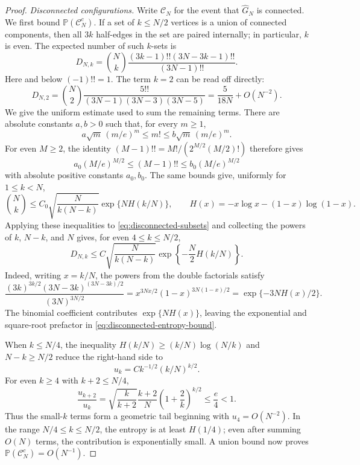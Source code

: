 \documentclass[11pt]{article}
\newcommand{\Pp}{\mathbb P}
\theoremstyle{plain}
\theoremstyle{definition}
\numberwithin{equation}{section}
\begin{document}
\begin{proof}
\noindent\emph{Disconnected configurations.}
Write $\mathcal C_N$ for the event that $\widehat G_N$ is connected.  We first
bound $\Pp(\mathcal C_N^c)$.  If a set of $k\leq N/2$ vertices is a union of
connected components, then all $3k$ half-edges in the set are paired
internally; in particular, $k$ is even.  The expected number of such
$k$-sets is
\begin{equation}\label{eq:disconnected-subsets}
  D_{N,k}=\binom Nk
  \frac{(3k-1)!!(3N-3k-1)!!}{(3N-1)!!}.
\end{equation}
Here and below $(-1)!!=1$.  The term $k=2$ can be read off directly:
\[
  D_{N,2}
  =\binom N2\frac{5!!}{(3N-1)(3N-3)(3N-5)}
  =\frac{5}{18N}+O(N^{-2}).
\]
We give the uniform estimate used to sum the remaining terms.  There are
absolute constants $a,b>0$ such that, for every $m\geq1$,
\begin{equation}\label{eq:stirling-bounds}
 a\sqrt m\,(m/e)^m\leq m!\leq b\sqrt m\,(m/e)^m.
\end{equation}
For even $M\geq2$, the identity
$(M-1)!!=M!/(2^{M/2}(M/2)!)$ therefore gives
\begin{equation}\label{eq:double-factorial-bounds}
 a_0(M/e)^{M/2}\leq (M-1)!!
 \leq b_0(M/e)^{M/2}
\end{equation}
with absolute positive constants $a_0,b_0$.  The same bounds give, uniformly
for $1\leq k<N$,
\[
 \binom Nk\leq
 C_0\sqrt{\frac{N}{k(N-k)}}\exp\{NH(k/N)\},
 \qquad
 H(x)=-x\log x-(1-x)\log(1-x).
\]
Applying these inequalities to \eqref{eq:disconnected-subsets} and collecting
the powers of $k$, $N-k$, and $N$ gives, for even $4\leq k\leq N/2$,
\begin{equation}\label{eq:disconnected-entropy-bound}
  D_{N,k}\leq
  C\sqrt{\frac{N}{k(N-k)}}
  \exp\left\{-\frac N2 H(k/N)\right\}.
\end{equation}
Indeed, writing $x=k/N$, the powers from the double factorials satisfy
\[
 \frac{(3k)^{3k/2}(3N-3k)^{(3N-3k)/2}}
      {(3N)^{3N/2}}
 =x^{3Nx/2}(1-x)^{3N(1-x)/2}
 =\exp\{-3NH(x)/2\}.
\]
The binomial coefficient contributes $\exp\{NH(x)\}$, leaving the
exponential and square-root prefactor in
\eqref{eq:disconnected-entropy-bound}.

When $k\leq N/4$, the inequality
$H(k/N)\geq(k/N)\log(N/k)$ and $N-k\geq N/2$ reduce the right-hand side to
\[
 u_k=Ck^{-1/2}(k/N)^{k/2}.
\]
For even $k\geq4$ with $k+2\leq N/4$,
\[
 \frac{u_{k+2}}{u_k}
 =\sqrt{\frac{k}{k+2}}\frac{k+2}{N}
   \left(1+\frac2k\right)^{k/2}
 \leq \frac e4<1.
\]
Thus the small-$k$ terms form a geometric tail beginning with
$u_4=O(N^{-2})$.  In the range $N/4\leq k\leq N/2$, the entropy is at least
$H(1/4)$; even after summing $O(N)$ terms, the contribution is exponentially
small.  A union bound now proves
$\Pp(\mathcal C_N^c)=O(N^{-1})$.


\end{proof}
\end{document}
